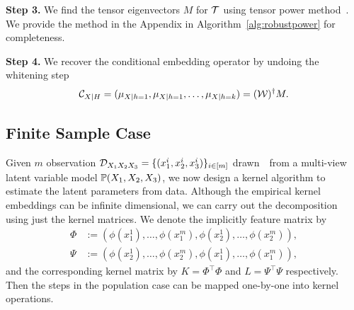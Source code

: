 \documentclass{article}
\begin{document}
{\bf Step 3.} We find the tensor eigenvectors $M$ for ${\mathcal{T}}$ using tensor power method~\cite{AnandkumarEtal:community12}. We provide the method in the Appendix in Algorithm~\ref{alg:robustpower} for completeness.

{\bf Step 4.} We recover the conditional embedding operator by undoing the whitening step
$$
  \mathcal{C}_{X|H} = (\mu_{X|h=1},\mu_{X|h=1},\ldots,\mu_{X|h=k}) = (\mathcal{W})^\dagger M.
$$

\subsection{Finite Sample Case}\label{sec:sample}

Given $m$ observation $\mathcal{D}_{X_1 X_2 X_3}=\{(x_1^i,x_2^i,x_3^i)\}_{i \in [m]}$ drawn~\iid~from a multi-view latent variable model $\mathbb{P}(X_1,X_2,X_3)$, we now design a kernel algorithm to estimate the latent parameters from data. Although the empirical kernel embeddings can be infinite dimensional, we can carry out the decomposition using just the kernel matrices.
We  denote the implicitly feature matrix by
\begin{align*}
  \Phi &:= (\phi(x_1^1), \ldots, \phi(x_1^m), \phi(x_2^1),  \ldots, \phi(x_2^m)),  \\
  \Psi &:= (\phi(x_2^1), \ldots, \phi(x_2^m), \phi(x_1^1),  \ldots, \phi(x_1^m)),
\end{align*}
and the corresponding kernel matrix by $K = \Phi^\top \Phi$ and $L = \Psi^\top \Psi$ respectively.
Then the steps in the population case can be mapped one-by-one into kernel operations.
\end{document}
